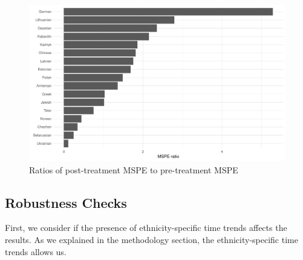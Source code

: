 \begin{figure}[h]
\centering
\includegraphics[width=\textwidth]{plots/synthetic_control/mspe_ratios.pdf}
\caption{Ratios of post-treatment MSPE to pre-treatment MSPE}
\label{fig:sc_mspe_ratios}
\end{figure}


\subsection{Robustness Checks} \label{subsec:robust_checks}
First, we consider if the presence of ethnicity-specific time trends affects the results. As we explained in the methodology section, the ethnicity-specific time trends allows us. 
